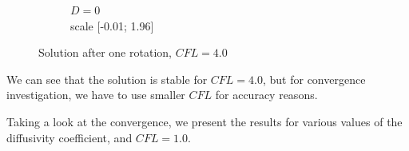 \documentclass[mathserif]{beamer}
\begin{document}
\begin{frame}
\begin{figure}[H]
\begin{subfigure}[H]{0.3\textwidth}
		\vspace{-3mm}
		\caption{$D = 0$\\\vspace{-2mm}scale \emph{}[-0.01; 1.96]}
	\end{subfigure}
	\vspace{-3mm}
	\caption{Solution after one rotation, $CFL = 4.0$}	
\end{figure}
\noindent



We can see that the solution is stable for $CFL = 4.0$, but for convergence investigation, we have to use smaller $CFL$ for accuracy reasons.


\end{frame}



\begin{frame}
Taking a look at the convergence, we present the results for various values of the diffusivity coefficient, and $CFL=1.0$.
\begin{figure}[H]
\centering
	\begin{subfigure}[H]{0.02\textwidth}

\end{subfigure}
\end{figure}
\end{frame}
\end{document}
